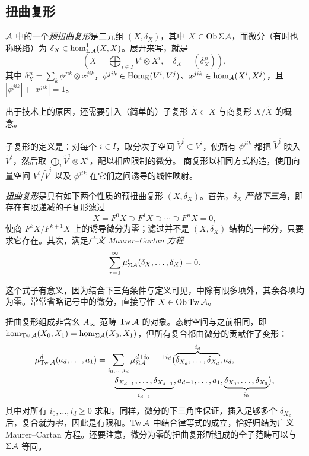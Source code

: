 \subsection{扭曲复形}\label{sec:3l}
\begin{definition*}
$\mathcal A$ 中的一个\emph{预扭曲复形}是二元组 $(X,\delta_X)$，其中 $X\in\operatorname{Ob}\Sigma\mathcal A$，而微分（有时也称联络）为 $\delta_X\in\hom^1_{\Sigma\mathcal A}(X,X)$。展开来写，就是
\begin{equation}\label{eq:3.18}
\left(X=\bigoplus_{i\in I}V^i\otimes X^i,\quad\delta_X=(\delta_X^{ji})\right),
\end{equation}
其中 $\delta_X^{ji}=\sum_k\phi^{jik}\otimes x^{jik}$，$\phi^{jik}\in\operatorname{Hom}_{\mathbb K}(V^i,V^j)$、$x^{jik}\in\hom_{\mathcal A}(X^i,X^j)$，且 $|\phi^{jik}|+|x^{jik}|=1$。
\end{definition*}
出于技术上的原因，还需要引入（简单的）子复形 $\widetilde X\subset X$ 与商复形 $X/\widetilde X$ 的概念。
\begin{definition*}
子复形的定义是：对每个 $i\in I$，取分次子空间 $\widetilde V^i\subset V^i$，使所有 $\phi^{jik}$ 都把 $\widetilde V^i$ 映入 $\widetilde V^j$，然后取 $\bigoplus_i\widetilde V^i\otimes X^i$，配以相应限制的微分。
商复形以相同方式构造，使用向量空间 $V^i/\widetilde V^i$ 以及 $\phi^{jik}$ 在它们之间诱导的线性映射。
\end{definition*}
\begin{definition*}
\emph{扭曲复形}是具有如下两个性质的预扭曲复形 $(X,\delta_X)$。首先，$\delta_X$ \emph{严格下三角}，即存在有限递减的子复形滤过
\[
X=F^0X\supset F^1X\supset\cdots\supset F^nX=0,
\]
使商 $F^kX/F^{k+1}X$ 上的诱导微分为零；滤过并不是 $(X,\delta_X)$ 结构的一部分，只要求它存在。其次，满足\emph{广义 Maurer–Cartan 方程}
\begin{equation}\label{eq:3.19}
\sum_{r=1}^{\infty}\mu^r_{\Sigma\mathcal A}(\delta_X,\ldots,\delta_X)=0.
\end{equation}

\end{definition*}
这个式子有意义，因为结合下三角条件与定义可见，中除有限多项外，其余各项均为零。常常省略记号中的微分，直接写作 $X\in\operatorname{Ob}\operatorname{Tw}\mathcal A$。

扭曲复形组成非含幺 $A_\infty$ 范畴 $\operatorname{Tw}\mathcal A$ 的对象。态射空间与之前相同，即 $\hom_{\operatorname{Tw}\mathcal A}(X_0,X_1)=\hom_{\Sigma\mathcal A}(X_0,X_1)$，但所有复合都由微分的贡献作了变形：
\begin{equation}\label{eq:3.20}
\begin{aligned}
\mu^d_{\operatorname{Tw}\mathcal A}(a_d,\ldots,a_1)
&=\sum_{i_0,\ldots,i_d}\mu^{d+i_0+\cdots+i_d}_{\Sigma\mathcal A}\bigl(\overbrace{\delta_{X_d},\ldots,\delta_{X_d}}^{i_d},a_d,\\[-2pt]
&\qquad\underbrace{\delta_{X_{d-1}},\ldots,\delta_{X_{d-1}}}_{i_{d-1}},a_{d-1},\ldots,a_1,\underbrace{\delta_{X_0},\ldots,\delta_{X_0}}_{i_0}\bigr),
\end{aligned}
\end{equation}
其中对所有 $i_0,\ldots,i_d\geq0$ 求和。同样，微分的下三角性保证，插入足够多个 $\delta_{X_k}$ 后，复合就为零，因此是有限和。$\operatorname{Tw}\mathcal A$ 中结合律等式的成立，恰好归结为广义 Maurer–Cartan 方程。还要注意，微分为零的扭曲复形所组成的全子范畴可以与 $\Sigma\mathcal A$ 等同。

